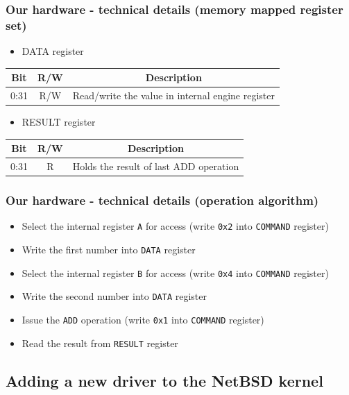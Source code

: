 \documentclass[dvipsnames,table]{beamer}
\begin{document}
\begin{frame}
\frametitle{Our hardware - technical details (memory mapped register set)}
\scriptsize
\begin{itemize}
	\item DATA register
\end{itemize}
\begin{center}
\begin{tabular}{|c|c|c|}
\hline
Bit & R/W & Description \\
\hline
\hline
0:31 & R/W & Read/write the value in internal engine register \\
\hline
\end{tabular}
\end{center}
\begin{itemize}
	\item RESULT register 
\end{itemize}
\begin{center}
\begin{tabular}{|c|c|c|}
\hline
Bit & R/W & Description \\
\hline
\hline
0:31 & R & Holds the result of last ADD operation \\
\hline
\end{tabular}
\end{center}
\end{frame}

\begin{frame}
\frametitle{Our hardware - technical details (operation algorithm)}
\begin{itemize}
	\item Select the internal register {\tt A} for access (write {\tt 0x2} into {\tt COMMAND} register)
	\item Write the first number into {\tt DATA} register
	\item Select the internal register {\tt B} for access (write {\tt 0x4} into {\tt COMMAND} register)
	\item Write the second number into {\tt DATA} register
	\item Issue the {\tt ADD} operation (write {\tt 0x1} into {\tt COMMAND} register)
	\item Read the result from {\tt RESULT} register

\end{itemize}
\end{frame}

\subsection{Adding a new driver to the NetBSD kernel}
\end{document}
